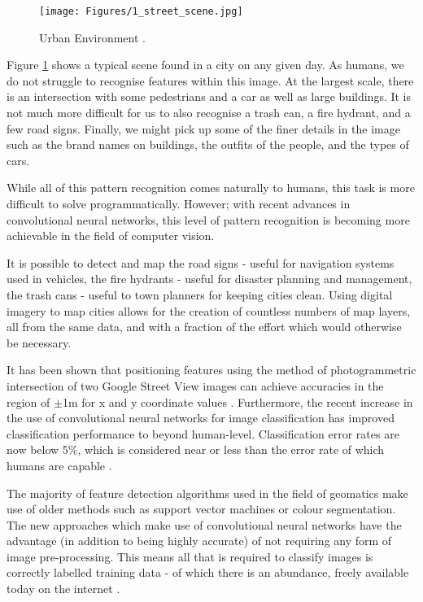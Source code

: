 \begin{figure}[!ht]
\centering
\texttt{[image: Figures/1\_street\_scene.jpg]}
\decoRule
\caption[Street Scene]{Urban Environment \parencite{img1.1}.}
\label{fig:1.1}
\end{figure}

Figure \ref{fig:1.1} shows a typical scene found in a city on any given day. As humans, we do not struggle to recognise features within this image. At the largest scale, there is an intersection with some pedestrians and a car as well as large buildings. It is not much more difficult for us to also recognise a trash can, a fire hydrant, and a few road signs. Finally, we might pick up some of the finer details in the image such as the brand names on buildings, the outfits of the people, and the types of cars.

While all of this pattern recognition comes naturally to humans, this task is more difficult to solve programmatically. However; with recent advances in convolutional neural networks, this level of pattern recognition is becoming more achievable in the field of computer vision.

It is possible to detect and map the road signs - useful for navigation systems used in vehicles, the fire hydrants - useful for disaster planning and management, the trash cans - useful to town planners for keeping cities clean. Using digital imagery to map cities allows for the creation of countless numbers of map layers, all from the same data, and with a fraction of the effort which would otherwise be necessary.

It has been shown that positioning features using the method of photogrammetric intersection of two Google Street View images can achieve accuracies in the region of $\pm$1m for x and y coordinate values \parencite{ref2.8}. Furthermore, the recent increase in the use of convolutional neural networks for image classification has improved classification performance to beyond human-level. Classification error rates are now below 5\%, which is considered near or less than the error rate of which humans are capable \parencite{convolution1}.

The majority of feature detection algorithms used in the field of geomatics make use of older methods such as support vector machines or colour segmentation. The new approaches which make use of convolutional neural networks have the advantage (in addition to being highly accurate) of not requiring any form of image pre-processing. This means all that is required to classify images is correctly labelled training data - of which there is an abundance, freely available today on the internet \parencite{imagenet1}.

